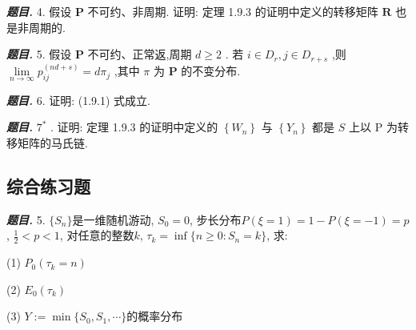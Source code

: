 \documentclass[10pt, a4paper, oneside]{ctexart}
\newenvironment{problem}{\begin{framed}\par\noindent\textbf{\textit{题目. }}}{\end{framed}\par}
\begin{document}
\begin{problem}
    4. 假设 \( \mathbf{P} \) 不可约、非周期. 证明: 定理 1.9.3 的证明中定义的转移矩阵 \( \mathbf{R} \) 也是非周期的.
\end{problem}

\begin{problem}
    5. 假设  \( \mathbf{P} \)  不可约、正常返,周期  \( d \geq  2 \) . 若  \( i \in  {D}_{r},j \in  {D}_{r + s} \) ,则 \( \mathop{\lim }\limits_{{n \rightarrow  \infty }}{p}_{ij}^{\left( nd + s\right) } = d{\pi }_{j} \) ,其中 \( \pi  \) 为 \( \mathbf{P} \) 的不变分布.
\end{problem}

\begin{problem}
    6. 证明: (1.9.1) 式成立.
\end{problem}

\begin{problem}
    \( {7}^{ * } \) . 证明: 定理 1.9.3 的证明中定义的 \( \left\{  {W}_{n}\right\}   \) 与 \( \left\{  {Y}_{n}\right\}   \) 都是 \( S \) 上以 \( \mathrm{P} \) 为转移矩阵的马氏链.
\end{problem}

\subsection{综合练习题}

\begin{problem}
    5. $\{S_n\}$是一维随机游动, $S_0=0$, 步长分布$P(\xi=1)=1-P(\xi=-1)=p$, $\frac{1}{2}<p<1$, 对任意的整数$k$, $\tau_k=\inf\{n\geq 0 : S_n=k\}$, 求:

(1) $P_0(\tau_k=n)$

(2) $E_0(\tau_k)$

(3) $Y:=\min\{S_0,S_1,\cdots\}$的概率分布
\end{problem}
\end{document}

